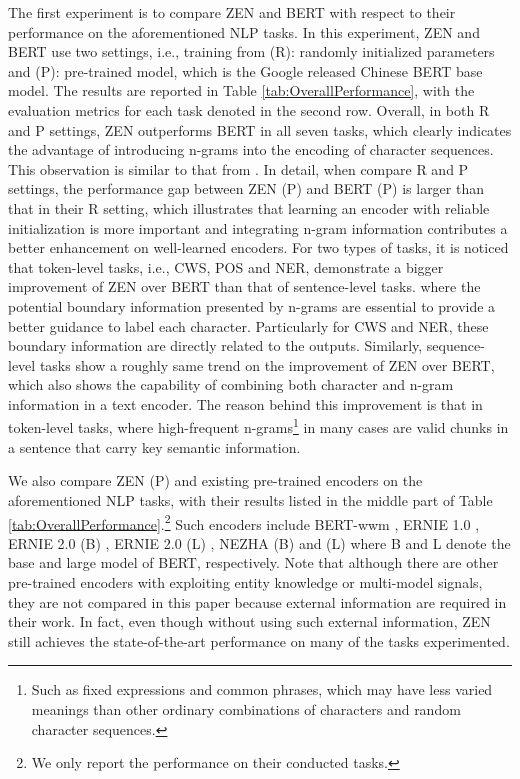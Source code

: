 \documentclass[11pt,a4paper]{article}
\begin{document}
\begin{CJK}{UTF8}{gbsn}
The first experiment is to compare ZEN and BERT with respect to their performance on the aforementioned NLP tasks.
In this experiment, ZEN and BERT use two settings, i.e., training from (R): randomly initialized parameters and (P): pre-trained model, which is the Google released Chinese BERT base model.
The results are reported in Table \ref{tab:OverallPerformance}, with the evaluation metrics for each task denoted in the second row.
Overall, in both R and P settings, ZEN outperforms BERT in all seven tasks, which clearly indicates the advantage of introducing n-grams into the encoding of character sequences.
This observation is similar to that from \citet{dos2014deep, lample2016neural, bojanowski2017enriching, liu2019encoding}.
In detail, when compare R and P settings, the performance gap between ZEN (P) and BERT (P) is larger than that in their R setting,
which illustrates that learning an encoder with reliable initialization is more important and integrating n-gram information contributes a better enhancement on well-learned encoders.
For two types of tasks, it is noticed that token-level tasks, i.e., CWS, POS and NER, demonstrate
a bigger improvement of ZEN over BERT than that of sentence-level tasks.
where the potential boundary information presented by n-grams are essential to provide a better guidance to label each character.
Particularly for CWS and NER, these boundary information are directly related to the outputs.
Similarly, sequence-level tasks show a roughly same trend on the improvement of ZEN over BERT,
which also shows the capability of combining both character and n-gram information in a text encoder.
The reason behind this improvement is that in token-level tasks,
where high-frequent n-grams\footnote{Such as fixed expressions and common phrases, which may have less varied meanings than other ordinary combinations of characters and random character sequences.} in many cases are valid chunks in a sentence that carry key semantic information.















We also compare ZEN (P) and existing pre-trained encoders on the aforementioned NLP tasks, with their results listed in the middle part of Table \ref{tab:OverallPerformance}.\footnote{We only report the performance on their conducted tasks.}
Such encoders include BERT-wwm \citep{cui2019pre}, ERNIE 1.0 \citep{sun2019ernie}, ERNIE 2.0 (B) \citep{sun2019ernie2}, ERNIE 2.0 (L) \citep{sun2019ernie2}, NEZHA (B) and (L) \citep{wei2019nezha} where B and L denote the base and large model of BERT, respectively. Note that although there are other pre-trained encoders with exploiting entity knowledge or multi-model signals, they are not compared in this paper because external information are required in their work.
In fact, even though without using such external information, ZEN still achieves the state-of-the-art performance on many of the tasks experimented.


\end{CJK}
\end{document}
